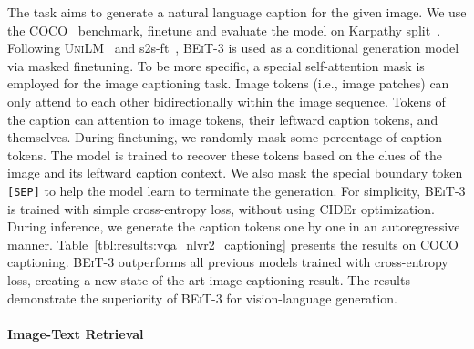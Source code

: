 \documentclass{article}
\newcommand{\sptk}[1]{\texttt{[#1]}}
\newcommand\our{\textsc{BEiT-3}}
\begin{document}
The task aims to generate a natural language caption for the given image.
We use the COCO~\citep{coco} benchmark, finetune and evaluate the model on Karpathy split~\citep{karpathysplit}. 
Following \textsc{UniLM}~\citep{unilm} and s2s-ft~\citep{s2s-ft}, \our{} is used as a conditional generation model via masked finetuning.
To be more specific, a special self-attention mask is employed for the image captioning task.
Image tokens (i.e., image patches) can only attend to each other bidirectionally within the image sequence.
Tokens of the caption can attention to image tokens, their leftward caption tokens, and themselves.
During finetuning, we randomly mask some percentage of caption tokens.
The model is trained to recover these tokens based on the clues of the image and its leftward caption context.
We also mask the special boundary token \sptk{SEP} to help the model learn to terminate the generation.
For simplicity, \our{} is trained with simple cross-entropy loss, without using CIDEr optimization.
During inference, we generate the caption tokens one by one in an autoregressive manner.
Table~\ref{tbl:results:vqa_nlvr2_captioning} presents the results on COCO captioning.
\our{} outperforms all previous models trained with cross-entropy loss, creating a new state-of-the-art image captioning result.
The results demonstrate the superiority of \our{} for vision-language generation.

\paragraph{Image-Text Retrieval}
\end{document}
